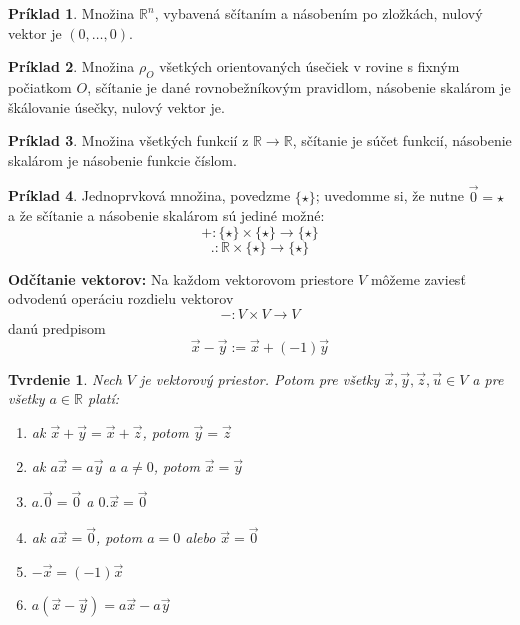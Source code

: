 \documentclass{article}
\theoremstyle{definition}
\newtheorem{priklad}{Príklad}[section]
\theoremstyle{plain}
\newtheorem{tvrdenie}{Tvrdenie}[section]
\begin{document}
\begin{priklad}
Množina $\mathbb{R}^n$, vybavená sčítaním a násobením po zložkách, nulový vektor
je $(0,\dots,0)$.
\end{priklad}

\begin{priklad}
Množina $\rho_O$ všetkých orientovaných úsečiek v rovine s fixným počiatkom $O$,
sčítanie je dané rovnobežníkovým pravidlom, násobenie skalárom je škálovanie
úsečky, nulový vektor je.
\end{priklad}

\begin{priklad}
Množina všetkých funkcií z $\mathbb{R} \rightarrow \mathbb{R}$, sčítanie je súčet funkcií, násobenie skalárom je násobenie funkcie číslom.
\end{priklad}

\begin{priklad}
Jednoprvková množina, povedzme $\{\star\}$; uvedomme si, že nutne $\vec{0} = \star$ a že sčítanie a násobenie skalárom sú jediné možné:
$$ + : \{\star\} \times \{\star\} \rightarrow \{\star\} $$
$$ . : \mathbb{R} \times \{\star\} \rightarrow \{\star\} $$
\end{priklad}

\textbf{Odčítanie vektorov:} Na každom vektorovom priestore $V$ môžeme zaviesť odvodenú operáciu rozdielu vektorov
$$ - : V \times V \rightarrow V $$
danú predpisom
$$ \vec{x} - \vec{y} := \vec{x} + (-1)\vec{y} $$

\begin{tvrdenie}
Nech $V$ je vektorový priestor. Potom pre všetky $\vec{x}, \vec{y}, \vec{z}, \vec{u} \in V$ a pre všetky $a \in \mathbb{R}$ platí:
\begin{enumerate}
    \item[a)] ak $\vec{x} + \vec{y} = \vec{x} + \vec{z}$, potom $\vec{y} = \vec{z}$
    \item[b)] ak $a\vec{x} = a\vec{y}$ a $a \neq 0$, potom $\vec{x} = \vec{y}$
    \item[c)] $a . \vec{0} = \vec{0}$ a $0 . \vec{x} = \vec{0}$
    \item[d)] ak $a\vec{x} = \vec{0}$, potom $a = 0$ alebo $\vec{x} = \vec{0}$
    \item[e)] $-\vec{x} = (-1)\vec{x}$
    \item[f)] $a(\vec{x} - \vec{y}) = a\vec{x} - a\vec{y}$
\end{enumerate}
\end{tvrdenie}
\end{document}
